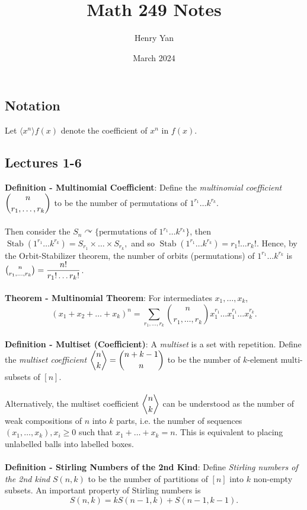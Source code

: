 \documentclass{article}
\title{Math 249 Notes}
\author{Henry Yan}
\date{March 2024}
\DeclareMathOperator{\Stab}{Stab}
\def\acts{\curvearrowright}
\newcommand{\angbinom}[2]{\genfrac{\langle}{\rangle}{0pt}{}{#1}{#2}}
\begin{document}
\maketitle

\subsection*{Notation}
Let $\langle x^n \rangle f(x)$ denote the coefficient of $x^n$ in $f(x)$.
\subsection*{Lectures 1-6}
\textbf{Definition - Multinomial Coefficient}: Define the \textit{multinomial coefficient} $\mathlarger{\binom{n}{r_1, \dots, r_k}}$ to be the number of permutations of $1^{r_1} \dots k^{r_k}$. \\ \\
Then consider the $S_n \acts \{\text{permutations of }1^{r_1} \dots k^{r_k}\}$, then $\Stab(1^{r_1} \dots k^{r_k}) = S_{r_1} \times \dots \times S_{r_k},$ and so $\Stab(1^{r_1} \dots k^{r_k}) = r_1! \dots r_k!$. Hence, by the Orbit-Stabilizer theorem, the number of orbits (permutations) of $1^{r_1} \dots k^{r_k}$ is $\binom{n}{r_1, \dots, r_k} = \mathlarger{\frac{n!}{r_1! \dots r_k!}}$. \\ \\
\textbf{Theorem - Multinomial Theorem}: For intermediates $x_1, \dots, x_k$, $$(x_1 + x_2 + \dots + x_k)^n = \sum_{r_1, \dots, r_k} \binom{n}{r_1, \dots, r_k} x_1^{r_1} \dots x_1^{r_1} \dots x_k^{r_k}.$$ \\
\textbf{Definition - Multiset (Coefficient)}: A \textit{multiset} is a set with repetition. Define the \textit{multiset coefficient} $\mathlarger{\angbinom{n}{k} = {n + k - 1 \choose n}}$ to be the number of $k$-element multi-subsets of $[n]$. \\ \\
Alternatively, the multiset coefficient $\mathlarger{\angbinom{n}{k}}$ can be understood as the number of weak compositions of $n$ into $k$ parts, i.e. the number of sequences $(x_1, \dots, x_k), x_i \geq 0$ such that $x_1 + \dots + x_k = n$. This is equivalent to placing unlabelled balls into labelled boxes. \\ \\
\textbf{Definition - Stirling Numbers of the 2nd Kind}: Define \textit{Stirling numbers of the 2nd kind} $S(n, k)$ to be the number of partitions of $[n]$ into $k$ non-empty subsets. An important property of Stirling numbers is $$S(n, k) = kS(n - 1, k) + S(n - 1, k - 1).$$ \\
\end{document}
